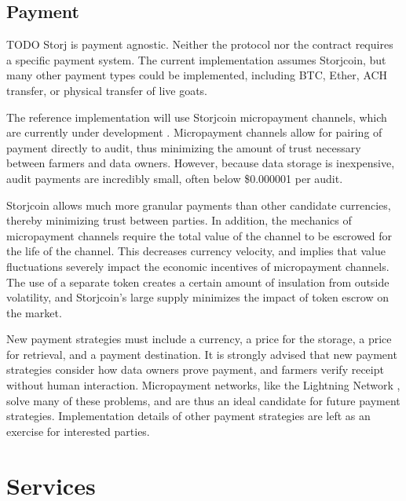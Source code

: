 \documentclass[a4paper,10pt]{article}
\newcommand{\todo}[1]{{\color{red} TODO #1}}
\begin{document}
\subsection{Payment}

\todo{
Storj is payment agnostic. Neither the protocol nor the contract requires a
specific payment system. The current implementation assumes Storjcoin, but many
other payment types could be implemented, including BTC, Ether, ACH transfer, or
physical transfer of live goats.

The reference implementation will use Storjcoin micropayment channels, which are
currently under development \cite{26}. Micropayment channels allow for pairing
of payment directly to audit, thus minimizing the amount of trust necessary
between farmers and data owners. However, because data storage is inexpensive,
audit payments are incredibly small, often below \$0.000001 per audit.

Storjcoin allows much more granular payments than other candidate currencies,
thereby minimizing trust between parties. In addition, the mechanics of
micropayment channels require the total value of the channel to be escrowed for
the life of the channel. This decreases currency velocity, and implies that
value fluctuations severely impact the economic incentives of micropayment
channels. The use of a separate token creates a certain amount of insulation
from outside volatility, and Storjcoin's large supply minimizes the impact of
token escrow on the market.

New payment strategies must include a currency, a price for the storage, a price
for retrieval, and a payment destination. It is strongly advised that new
payment strategies consider how data owners prove payment, and farmers verify
receipt without human interaction. Micropayment networks, like the Lightning
Network \cite{25}, solve many of these problems, and are thus an ideal candidate
for future payment strategies. Implementation details of other payment
strategies are left as an exercise for interested parties.
}

\section{Services}
\end{document}
